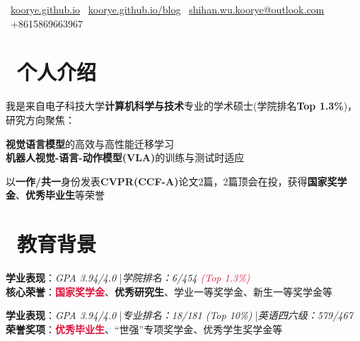 \documentclass{resume}
\begin{document}


\vspace{-2pt}

\vspace{-4pt}
\centerline{\sffamily\large{
\faHome\ \href{https://koorye.github.io}{koorye.github.io}
\textperiodcentered\faLink\ \href{https://koorye.github.io/blog}{koorye.github.io/blog}
\textperiodcentered\faEnvelope\ \href{mailto:shihan.wu.koorye@outlook.com}{shihan.wu.koorye@outlook.com}
\textperiodcentered\faPhone\ +8615869663967
}}

\vspace{-2pt}
\section{\faUser\ 个人介绍}

我是来自电子科技大学\textbf{计算机科学与技术}专业的学术硕士(学院排名\textbf{Top 1.3\%})，研究方向聚焦：

\faAngleRight \textbf{视觉语言模型}的高效与高性能迁移学习 \\
\faAngleRight \textbf{机器人视觉-语言-动作模型(VLA)}的训练与测试时适应

以\textbf{一作/共一}身份发表\textbf{CVPR(CCF-A)}论文2篇，2篇顶会在投，获得\textbf{国家奖学金}、\textbf{优秀毕业生}等荣誉

\vspace{-2pt}
\section{\faGraduationCap\ 教育背景}

\faAngleRight\textbf{学业表现}：\textit{GPA 3.94/4.0} \quad|\quad \textit{学院排名：6/454 \textcolor{crimson}{(Top 1.3\%)}} \\
\faAngleRight\textbf{核心荣誉}：\textbf{\textcolor{crimson}{国家奖学金}}、\textbf{优秀研究生}、学业一等奖学金、新生一等奖学金等

\vspace{2pt}
\faAngleRight\textbf{学业表现}：\textit{GPA 3.94/4.0} \quad|\quad \textit{专业排名：18/181 (Top 10\%)} \quad|\quad \textit{英语四六级：579/467} \\
\faAngleRight\textbf{荣誉奖项}：\textbf{\textcolor{crimson}{优秀毕业生}}、“世强”专项奖学金、优秀学生奖学金等
\end{document}
